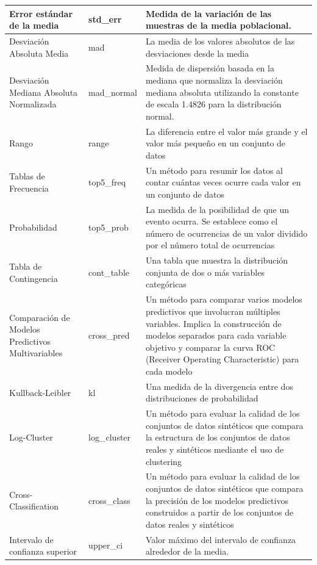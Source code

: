 \begin{longtable}{|m{7em}|m{5em}|m{20em}|}
    \hline
    Error estándar de la media & std\_err & Medida de la variación de las muestras de la media poblacional. \\
    \hline
    Desviación Absoluta Media & mad & La media de los valores absolutos de las desviaciones desde la media \\
    \hline
    Desviación Mediana Absoluta Normalizada & mad\_normal & Medida de dispersión basada en la mediana que normaliza la desviación mediana absoluta utilizando la constante de escala 1.4826 para la distribución normal. \\
    \hline
    Rango & range & La diferencia entre el valor más grande y el valor más pequeño en un conjunto de datos \\
    \hline
    Tablas de Frecuencia & top5\_freq & Un método para resumir los datos al contar cuántas veces ocurre cada valor en un conjunto de datos \\
    \hline
    Probabilidad & top5\_prob & La medida de la posibilidad de que un evento ocurra. Se establece como el número de ocurrencias de un valor dividido por el número total de ocurrencias \\
    \hline
    Tabla de Contingencia & cont\_table & Una tabla que muestra la distribución conjunta de dos o más variables categóricas \\
    \hline
    Comparación de Modelos Predictivos Multivariables & cross\_pred & Un método para comparar varios modelos predictivos que involucran múltiples variables. Implica la construcción de modelos separados para cada variable objetivo y comparar la curva ROC (Receiver Operating Characteristic) para cada modelo \\
    \hline
    Kullback-Leibler & kl & Una medida de la divergencia entre dos distribuciones de probabilidad \\
    \hline
    Log-Cluster & log\_cluster & Un método para evaluar la calidad de los conjuntos de datos sintéticos que compara la estructura de los conjuntos de datos reales y sintéticos mediante el uso de clustering \\
    \hline
    Cross-Classification & cross\_class & Un método para evaluar la calidad de los conjuntos de datos sintéticos que compara la precisión de los modelos predictivos construidos a partir de los conjuntos de datos reales y sintéticos \\
    \hline
    Intervalo de confianza superior & upper\_ci & Valor máximo del intervalo de confianza alrededor de la media. \\
    \hline

\end{longtable}
